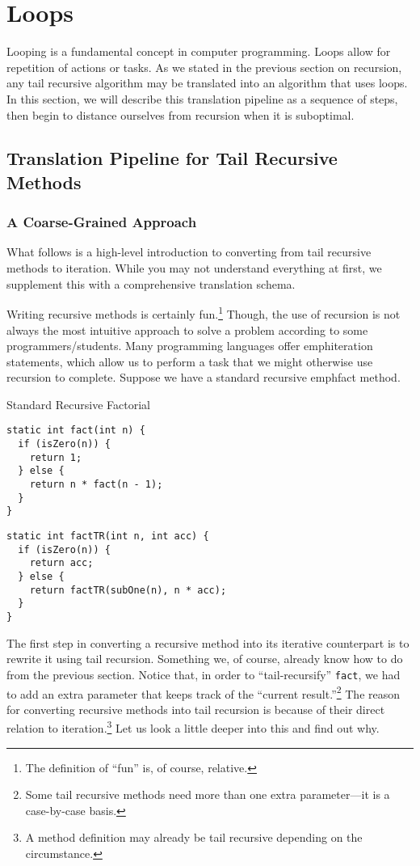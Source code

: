 \section{Loops}

Looping is a fundamental concept in computer programming. Loops allow for repetition of actions or tasks. As we stated in the previous section on recursion, any tail recursive algorithm may be translated into an algorithm that uses loops. In this section, we will describe this translation pipeline as a sequence of steps, then begin to distance ourselves from recursion when it is suboptimal.

\subsection{Translation Pipeline for Tail Recursive Methods}
\subsubsection*{A Coarse-Grained Approach}
What follows is a high-level introduction to converting from tail recursive methods to iteration. While you may not understand everything at first, we supplement this with a comprehensive translation schema.

Writing recursive methods is certainly fun.\footnote{The definition of ``fun'' is, of course, relative.} Though, the use of recursion is not always the most intuitive approach to solve a problem according to some programmers/students. Many programming languages offer emph{iteration} statements, which allow us to perform a task that we might otherwise use recursion to complete. Suppose we have a standard recursive emph{fact} method. 
\begin{clrr}[]{Standard Recursive Factorial}
\begin{lstlisting}[language=MyJava]
static int fact(int n) {
  if (isZero(n)) { 
    return 1; 
  } else {
    return n * fact(n - 1);
  }
}
\end{lstlisting}
\tcblower
\begin{lstlisting}[language=MyJavaNLN]
static int factTR(int n, int acc) {
  if (isZero(n)) { 
    return acc; 
  } else {
    return factTR(subOne(n), n * acc);
  }
}
\end{lstlisting}
\end{clrr}
The first step in converting a recursive method into its iterative counterpart is to rewrite it using tail recursion. Something we, of course, already know how to do from the previous section. 
Notice that, in order to ``tail-recursify'' \texttt{fact}, we had to add an extra parameter that keeps track of the ``current result.''\footnote{Some tail recursive methods need more than one extra parameter---it is a case-by-case basis.} The reason for converting recursive methods into tail recursion is because of their direct relation to iteration.\footnote{A method definition may already be tail recursive depending on the circumstance.} Let us look a little deeper into this and find out why.

